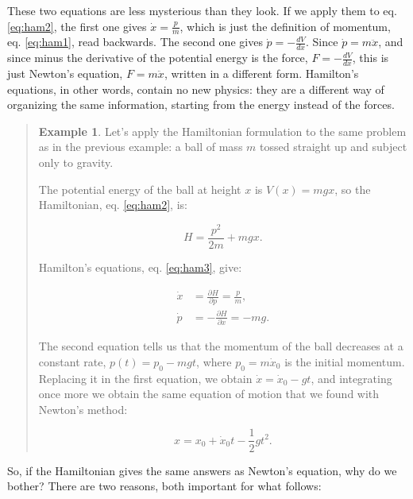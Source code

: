 \documentclass[
  english,
  9pt,
]{extbook}
\theoremstyle{definition}
\theoremstyle{definition}
\newtheorem{example}{Example}[chapter]
\theoremstyle{definition}
\theoremstyle{definition}
\theoremstyle{remark}
\begin{document}
These two equations are less mysterious than they look. If we apply them to eq. \eqref{eq:ham2}, the first one gives \(\dot{x}=\frac{p}{m}\), which is just the definition of momentum, eq. \eqref{eq:ham1}, read backwards. The second one gives \(\dot{p}=-\frac{dV}{dx}\). Since \(\dot{p}=m\ddot{x}\), and since minus the derivative of the potential energy is the force, \(F=-\frac{dV}{dx}\), this is just Newton's equation, \(F=m\ddot{x}\), written in a different form. Hamilton's equations, in other words, contain no new physics: they are a different way of organizing the same information, starting from the energy instead of the forces.

\begin{quote}
\begin{example}
\protect\hypertarget{exm:hamex1}{}\label{exm:hamex1}Let's apply the Hamiltonian formulation to the same problem as in the previous example: a ball of mass \(m\) tossed straight up and subject only to gravity.

The potential energy of the ball at height \(x\) is \(V(x)=mgx\), so the Hamiltonian, eq. \eqref{eq:ham2}, is:

\begin{equation}
H=\frac{p^2}{2m}+mgx.
\label{eq:ham4}
\end{equation}

Hamilton's equations, eq. \eqref{eq:ham3}, give:

\begin{equation}
\begin{aligned}
\dot{x} &= \frac{\partial H}{\partial p} = \frac{p}{m}, \\
\dot{p} &=-\frac{\partial H}{\partial x} = -mg.
\end{aligned}
\end{equation}

The second equation tells us that the momentum of the ball decreases at a constant rate, \(p(t)=p_0-mgt\), where \(p_0=m\dot{x}_0\) is the initial momentum. Replacing it in the first equation, we obtain \(\dot{x}=\dot{x}_0-gt\), and integrating once more we obtain the same equation of motion that we found with Newton's method:

\begin{equation}
x = x_0 + \dot{x}_0 t -\frac{1}{2}gt^2.
\end{equation}
\end{example}
\end{quote}

So, if the Hamiltonian gives the same answers as Newton's equation, why do we bother? There are two reasons, both important for what follows:
\end{document}
